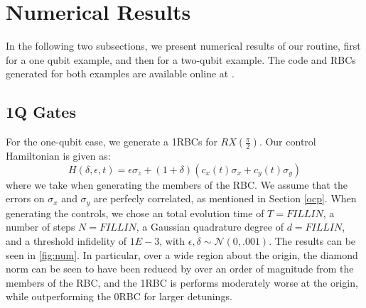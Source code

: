 \documentclass[aps,nofootinbib,pra,notitlepage,twocolumn]{revtex4-1}
\begin{document}

\section{Numerical Results}\label{numerical}
In the following two subsections, we present numerical results of our routine, first for a one qubit example, and then for a two-qubit example. The code and RBCs generated for both examples are available online at \cite{decorrelating_errors}.
\subsection{1Q Gates}\label{1Q Gates}
 For the one-qubit case, we generate a 1RBCs for $RX(\frac{\pi}{2})$. Our control Hamiltonian is given as:
\begin{equation}\label{eq:1Qham}
  H(\delta, \epsilon, t) = \epsilon\sigma_z + (1 + \delta)(c_x(t)\sigma_x + c_y(t)\sigma_y)
\end{equation}
where we take  when generating the members of the RBC. We assume that the errors on $\sigma_x$ and $\sigma_y$ are perfecly correlated, as mentioned in Section \ref{ocp}. When generating the controls, we chose an total evolution time of $T=FILL IN$, a number of steps $N=FILL IN$, a Gaussian quadrature degree of $d=FILL IN$, and a threshold infidelity of $1E-3$, with $\epsilon, \delta \sim \mathcal{N}(0, .001)$. The results can be seen in \ref{fig:num}. In particular, over a wide region about the origin, the diamond norm can be seen to have been reduced by over an order of magnitude from the members of the RBC, and the 1RBC is performs moderately worse at the origin, while outperforming the 0RBC for larger detunings.
\end{document}
